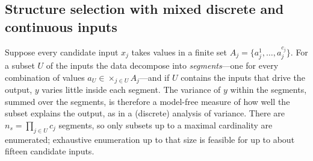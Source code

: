 \subsection{Structure selection with mixed discrete and continuous inputs}\label{sec:ts:structure}

Suppose every candidate input $x_j$ takes values in a finite set $A_j=\{a^1_j,\dots,a^{c_j}_j\}$. For a subset $U$ of the inputs the data decompose into \emph{segments}---one for every combination of values $a_U\in\times_{j\in U}A_j$---and if $U$ contains the inputs that drive the output, $y$ varies little inside each segment. The variance of $y$ within the segments, summed over the segments, is therefore a model-free measure of how well the subset explains the output, as in a (discrete) analysis of variance. There are $n_s=\prod_{j\in U}c_j$ segments, so only subsets up to a maximal cardinality are enumerated; exhaustive enumeration up to that size is feasible for up to about fifteen candidate inputs.


